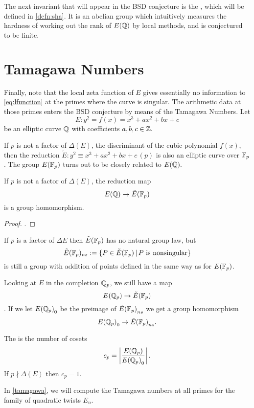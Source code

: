 \documentclass[12pt, a4paper]{report}
\begin{document}
The next invariant that will appear in the BSD conjecture is the
, which will
be defined in \autoref{defn:sha}. It is an abelian group which intuitively measures
the hardness of working out the rank of $E({\mathbb Q})$ by local methods, and is conjectured
to be finite.

\section{Tamagawa Numbers}

Finally, note that the local zeta function of $E$ gives essentially no
information to \autoref{eq:lfunction} at the primes where the curve is singular.
The arithmetic data at those
primes enters the BSD conjecture by means of the Tamagawa
Numbers.
Let
$$ E : y^2 = f(x) = x^3 + ax^2 + bx + c $$
be an elliptic curve ${\mathbb Q}$ with coefficients $a,b,c \in {\mathbb Z}.$

If $p$ is not a factor of $\Delta(E)$, the discriminant of the cubic polynomial
$f(x)$,
then the reduction
$\tilde{E} : y^2 \equiv x^3 +ax^2 + b x + c \, (p)$ is
also an elliptic curve over $\mathbb{F}_p$. The group $E(\mathbb{F}_p)$ turns out to be
closely related to $E({\mathbb Q}).$

\begin{prop}
  If $p $ is not a factor of $ \Delta(E)$, the reduction map
  $$E({\mathbb Q}) \rightarrow \tilde{E}(\mathbb{F}_p)$$ is a group homomorphism.
\end{prop}
\begin{proof}
  \cite[See][Chapter IV, pages 121-123]{rational}.
\end{proof}

If $p $ is a factor of $\Delta E$ then $\tilde{E}(\mathbb{F}_p)$ has no natural group law, but
\[
  \tilde{E}(\mathbb{F}_p)_{ns} := \{P \in \tilde{E}(\mathbb{F}_p) \,|\, P \text{ is nonsingular}\}
  \]
is still a group with addition of points defined in the same way as for $E(\mathbb{F}_p)$.

Looking at $E$ in the completion ${\mathbb Q}_p$, we still have a map
\[{E({\mathbb Q}_p)} \rightarrow {\tilde{E}(\mathbb{F}_p)}\].
If we let ${E({\mathbb Q}_p)}_0$ be the preimage of ${\tilde{E}(\mathbb{F}_p)}_{ns}$ we get a group homomorphism
\[ {E({\mathbb Q}_p)}_0 \rightarrow {\tilde{E}(\mathbb{F}_p)}_{ns}. \]

\begin{defn}
  The  is the number of cosets 
  $$c_p = \left| \frac{{E({\mathbb Q}_p)}}{{E({\mathbb Q}_p)}_0}
  \right|.$$
  If $p \nmid \Delta(E)$ then $c_p = 1$.
\end{defn}  

In \autoref{tamagawa}, we will compute the Tamagawa numbers at all
primes for the family of quadratic twists $E_n$. 
  
\end{document}
